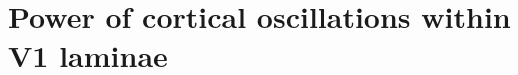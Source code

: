 \chapter{Power of cortical oscillations within V1 laminae}
\label{ch:lam}
\acresetall {} 

\graphicspath{{Chapters/laminar-chapter/}}

